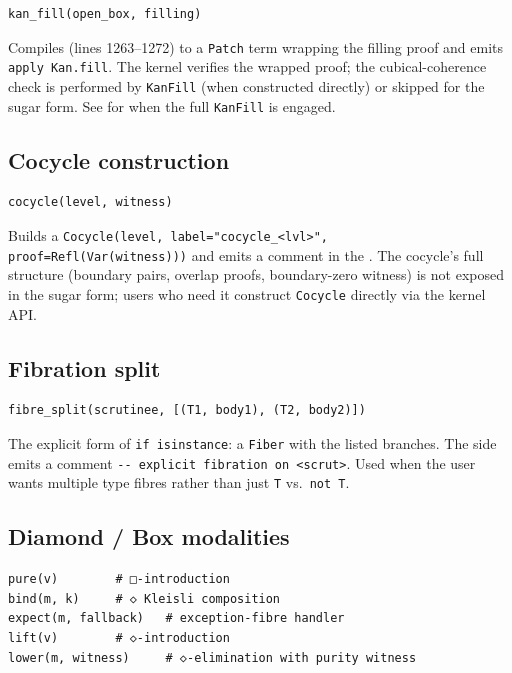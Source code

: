 \begin{lstlisting}[language=psdl]
kan_fill(open_box, filling)
\end{lstlisting}

Compiles (lines 1263--1272) to a \texttt{Patch} term wrapping the
filling proof and emits \verb|apply Kan.fill|.  The kernel verifies
the wrapped proof; the cubical-coherence check is performed by
\texttt{KanFill} (when constructed directly) or skipped for the
sugar form.  See  for when the full
\texttt{KanFill} is engaged.

\subsection{Cocycle construction}

\begin{lstlisting}[language=psdl]
cocycle(level, witness)
\end{lstlisting}

Builds a \texttt{Cocycle(level, label="cocycle\_<lvl>",
proof=Refl(Var(witness)))} and emits a comment in the \Lean{}.
The cocycle's full structure (boundary pairs, overlap proofs,
boundary-zero witness) is not exposed in the sugar form; users who
need it construct \texttt{Cocycle} directly via the kernel API.

\subsection{Fibration split}

\begin{lstlisting}[language=psdl]
fibre_split(scrutinee, [(T1, body1), (T2, body2)])
\end{lstlisting}

The explicit form of \texttt{if isinstance}: a \texttt{Fiber} with
the listed branches.  The \Lean{} side emits a comment
\verb|-- explicit fibration on <scrut>|.  Used when the user wants
multiple type fibres rather than just \texttt{T} vs.\ \texttt{not T}.

\subsection{Diamond / Box modalities}

\begin{lstlisting}[language=psdl]
pure(v)        # □-introduction
bind(m, k)     # ◇ Kleisli composition
expect(m, fallback)   # exception-fibre handler
lift(v)        # ◇-introduction
lower(m, witness)     # ◇-elimination with purity witness
\end{lstlisting}


